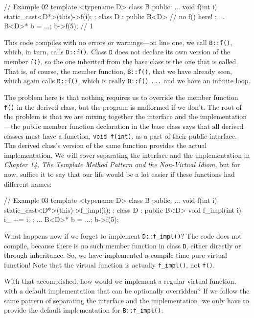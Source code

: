\begin{code}
// Example 02
template <typename D> class B {
  public:
  ...
  void f(int i) { static_cast<D*>(this)->f(i); }
};
class D : public B<D> {
  // no f() here!
};
...
B<D>* b = ...;
b->f(5); // 1
\end{code}

This code compiles with no errors or warnings---on line one, we call \texttt{B::f()}, which, in turn, calls \texttt{D::f()}. Class \texttt{D} does not declare its own version of the member \texttt{f()}, so the one inherited from the base class is the one that is called. That is, of course, the member function, \texttt{B::f()}, that we have already seen, which again calls \texttt{D::f()}, which is really \texttt{B::f()} \texttt{...} and we have an infinite loop.

The problem here is that nothing requires us to override the member function \texttt{f()} in the derived class, but the program is malformed if we don't. The root of the problem is that we are mixing together the interface and the implementation---the public member function declaration in the base class says that all derived classes must have a function, \texttt{void\ f(int)}, as a part of their public interface. The derived class's version of the same function provides the actual implementation. We will cover separating the interface and the implementation in \emph{Chapter 14, The Template Method Pattern and the Non-Virtual Idiom}, but for now, suffice it to say that our life would be a lot easier if these functions had different names:

\begin{code}
// Example 03
template <typename D> class B {
  public:
  ...
  void f(int i) { static_cast<D*>(this)->f_impl(i); }
};
class D : public B<D> {
  void f_impl(int i) { i_ += i; }
};
...
B<D>* b = ...;
b->f(5);
\end{code}

What happens now if we forget to implement \texttt{D::f\_impl()}? The code does not compile, because there is no such member function in class \texttt{D}, either directly or through inheritance. So, we have implemented a compile-time pure virtual function! Note that the virtual function is actually \texttt{f\_impl()}, not \texttt{f()}.

With that accomplished, how would we implement a regular virtual function, with a default implementation that can be optionally overridden? If we follow the same pattern of separating the interface and the implementation, we only have to provide the default implementation for \texttt{B::f\_impl()}:


